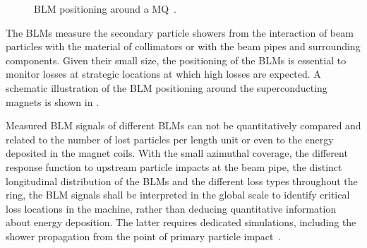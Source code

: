 \begin{figure}[htbp]
  \centering
  \caption{BLM positioning around a MQ~\cite{lechner:blmpos}.}  
  \label{pic:16071902}
  \end{figure}



The BLMs measure the secondary particle showers from the interaction of beam particles with the material of collimators or with the beam pipes and surrounding components. Given their small size, the positioning of the BLMs is essential to monitor losses at strategic locations at which high losses are expected. A schematic illustration of the BLM positioning around the superconducting magnets is shown in . 

Measured BLM signals of different BLMs can not be quantitatively compared and related to the number of lost particles per length unit or even to the energy deposited in the magnet coils. With the small azimuthal coverage, the different response function to upstream particle impacts at the beam pipe, the distinct longitudinal distribution of the BLMs and the different loss types throughout the ring, the BLM signals shall be interpreted in the global scale to identify critical loss locations in the machine, rather than deducing quantitative information about energy deposition. The latter requires dedicated simulations, including the shower propagation from the point of primary particle impact~\cite{PAC09:TH5RFP035}. 

